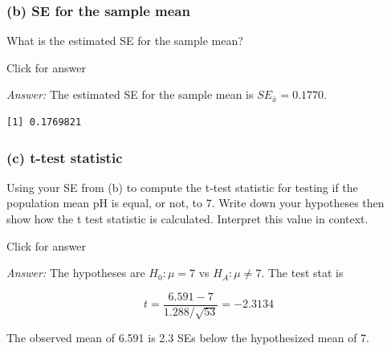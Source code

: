 \documentclass[
]{book}
\newenvironment{Shaded}{\begin{snugshade}}{\end{snugshade}}
\newcommand{\DecValTok}[1]{\textcolor[rgb]{0.00,0.00,0.81}{#1}}
\newcommand{\FunctionTok}[1]{\textcolor[rgb]{0.00,0.00,0.00}{#1}}
\newcommand{\NormalTok}[1]{#1}
\newcommand{\SpecialCharTok}[1]{\textcolor[rgb]{0.00,0.00,0.00}{#1}}
\begin{document}
\hypertarget{b-se-for-the-sample-mean}{%
\subsubsection{(b) SE for the sample mean}\label{b-se-for-the-sample-mean}}

What is the estimated SE for the sample mean?

Click for answer

\emph{Answer:} The estimated SE for the sample mean is \(SE_{\bar{x}} = 0.1770\).

\begin{Shaded}
\end{Shaded}

\begin{verbatim}
[1] 0.1769821
\end{verbatim}

\hypertarget{c-t-test-statistic}{%
\subsubsection{(c) t-test statistic}\label{c-t-test-statistic}}

Using your SE from (b) to compute the t-test statistic for testing if the population mean pH is equal, or not, to 7. Write down your hypotheses then show how the t test statistic is calculated. Interpret this value in context.

Click for answer

\emph{Answer:} The hypotheses are \(H_0: \mu = 7\) vs \(H_A: \mu \neq 7\). The test stat is

\[
t = \dfrac{6.591 - 7}{1.288/\sqrt{53}} = -2.3134
\]

The observed mean of 6.591 is 2.3 SEs below the hypothesized mean of 7.

\begin{Shaded}
\end{Shaded}
\end{document}
